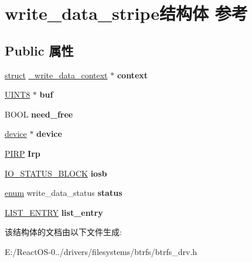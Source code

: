 \hypertarget{structwrite__data__stripe}{}\section{write\+\_\+data\+\_\+stripe结构体 参考}
\label{structwrite__data__stripe}
\subsection*{Public 属性}
\begin{DoxyCompactItemize}
\item 
\mbox{\label{structwrite__data__stripe_ae77911e6519a846a670deb30848ebb6c}} 
\hyperlink{interfacestruct}{struct} \hyperlink{struct__write__data__context}{\+\_\+write\+\_\+data\+\_\+context} $\ast$ {\bfseries context}
\item 
\mbox{\label{structwrite__data__stripe_a8c8b59efa2ba671cf8c04917db0513fd}} 
\hyperlink{_processor_bind_8h_ab27e9918b538ce9d8ca692479b375b6a}{U\+I\+N\+T8} $\ast$ {\bfseries buf}
\item 
\mbox{\label{structwrite__data__stripe_ae48f63142b6efb52eb5621bea82e5632}} 
B\+O\+OL {\bfseries need\+\_\+free}
\item 
\mbox{\label{structwrite__data__stripe_a6304efde0c3e839794fcc54c6aa7bfbe}} 
\hyperlink{structdevice}{device} $\ast$ {\bfseries device}
\item 
\mbox{\label{structwrite__data__stripe_a88bf80bf4ea130b39d34acc475643a5b}} 
\hyperlink{interfacevoid}{P\+I\+RP} {\bfseries Irp}
\item 
\mbox{\label{structwrite__data__stripe_a5f3d349b59774726d63109cf06d5f4fd}} 
\hyperlink{struct___i_o___s_t_a_t_u_s___b_l_o_c_k}{I\+O\+\_\+\+S\+T\+A\+T\+U\+S\+\_\+\+B\+L\+O\+CK} {\bfseries iosb}
\item 
\mbox{\label{structwrite__data__stripe_ac9ed8c96e301739da146b4817bf47170}} 
\hyperlink{interfaceenum}{enum} write\+\_\+data\+\_\+status {\bfseries status}
\item 
\mbox{\label{structwrite__data__stripe_ad1c708b33f51a05bf9aa8eaaad1c4d67}} 
\hyperlink{struct___l_i_s_t___e_n_t_r_y}{L\+I\+S\+T\+\_\+\+E\+N\+T\+RY} {\bfseries list\+\_\+entry}
\end{DoxyCompactItemize}


该结构体的文档由以下文件生成\+:\begin{DoxyCompactItemize}
\item 
E\+:/\+React\+O\+S-\/0../drivers/filesystems/btrfs/btrfs\+\_\+drv.\+h\end{DoxyCompactItemize}
